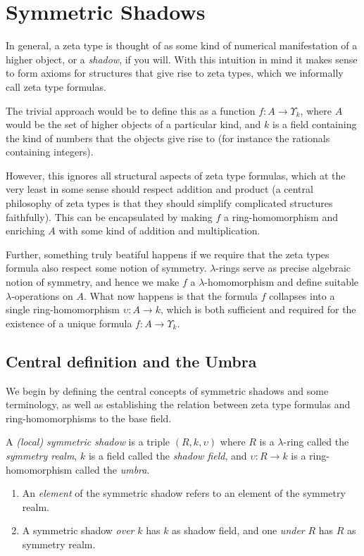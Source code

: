 \section{Symmetric Shadows}

In general, a zeta type is thought of as some kind of numerical manifestation of a higher object, or a \emph{shadow}, if you will. With this intuition in mind it makes sense to form axioms for structures that give rise to zeta types, which we informally call zeta type formulas.
 
 The trivial approach would be to define this as a function $f : A \to \Upsilon_k$, where $A$ would be the set of higher objects of a particular kind, and $k$ is a field containing the kind of numbers that the objects give rise to (for instance the rationals containing integers). 
 
 However, this ignores all structural aspects of zeta type formulas, which at the very least in some sense should respect addition and product (a central philosophy of zeta types is that they should simplify complicated structures faithfully). This can be encapsulated by making $f$ a ring-homomorphism and enriching $A$ with some kind of addition and multiplication. 
 
 Further, something truly beatiful happens if we require that the zeta types formula also respect some notion of symmetry. $\lambda$-rings serve as precise algebraic notion of symmetry, and hence we make $f$ a $\lambda$-homomorphism and define suitable $\lambda$-operations on $A$. What now happens is that the formula $f$ collapses into a single ring-homomorphism $\upsilon : A \to k$, which is both sufficient and required for the existence of a unique formula $f : A \to \Upsilon_k$.

\subsection{Central definition and the Umbra}
We begin by defining the central concepts of symmetric shadows and some terminology, as well as establishing the relation between zeta type formulas and ring-homomorphisms to the base field. 


\begin{definition}
  A \emph{(local) symmetric shadow} is a triple $(R, k, \upsilon)$ where $R$ is a $\lambda$-ring called the \emph{symmetry realm}, $k$ is a field called the \emph{shadow field}, and $\upsilon: R \to k$ is a ring-homomorphism called the \emph{umbra}. 
  \begin{enumerate}
    \item An \emph{element} of the symmetric shadow refers to an element of the symmetry realm. 
    \item A symmetric shadow \emph{over} $k$ has $k$ as shadow field, and one \emph{under} $R$ has $R$ as symmetry realm.
  \end{enumerate}
\end{definition}

